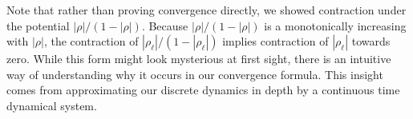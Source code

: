 \documentclass[twoside]{article}
\newcommand{\E}{\E}
\newtheorem{theorem}{Theorem}
\newtheorem{corollary}{Corollary}
\theoremstyle{definition}
\begin{document}
Note that rather than proving convergence directly, we showed contraction under the potential $|\rho|/(1-|\rho|).$ Because $|\rho|/(1-|\rho|)$ is a monotonically increasing with $|\rho|$, the contraction of $|\rho_\ell|/(1-|\rho_\ell|)$ implies contraction of $|\rho_\ell|$ towards zero. 
While this form might look mysterious at first sight, there is an intuitive way of understanding why it occurs in our convergence formula. This insight comes from approximating our discrete dynamics in depth by a continuous time dynamical system. 





\end{document}
